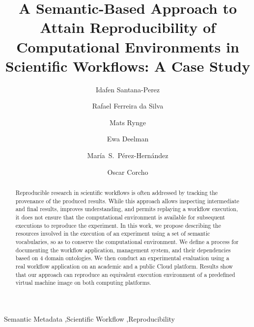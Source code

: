 \documentclass[final,5p,times,twocolumn]{elsarticle}
\begin{document}
\begin{frontmatter}

\title{A Semantic-Based Approach to Attain Reproducibility of Computational Environments in Scientific Workflows: A Case Study}

\author[upm]{Idafen Santana-Perez}

\author[isi]{Rafael Ferreira da Silva}

\author[isi]{Mats Rynge}

\author[isi]{Ewa Deelman}

\author[upm]{Mar\'ia~S.~P\'erez-Hern\'andez}

\author[upm]{Oscar Corcho}


\address[upm]{Ontology Engineering Group, Universidad Polit\'ecnica de Madrid, Madrid, Spain }
\address[isi]{University of Southern California, Information Sciences Institute, Marina del Rey, CA, USA}


\begin{abstract}
Reproducible research in scientific workflows is often addressed by tracking the provenance of the produced results. While this approach allows inspecting intermediate and final results, improves understanding, and permits replaying a workflow execution, it does not ensure that the computational environment is available for subsequent executions to reproduce the experiment. In this work, we propose describing the resources involved in the execution of an experiment using a set of semantic vocabularies, so as to conserve the computational environment. We define a process for documenting the workflow application, management system, and their dependencies based on 4 domain ontologies. We then conduct an experimental evaluation using a real workflow application on an academic and a public Cloud platform. Results show that our approach can reproduce an equivalent execution environment of a predefined virtual machine image on both computing platforms.
\end{abstract}

\begin{keyword}
Semantic Metadata \sep Scientific Workflow \sep Reproducibility
\end{keyword}


\end{frontmatter}
\end{document}
